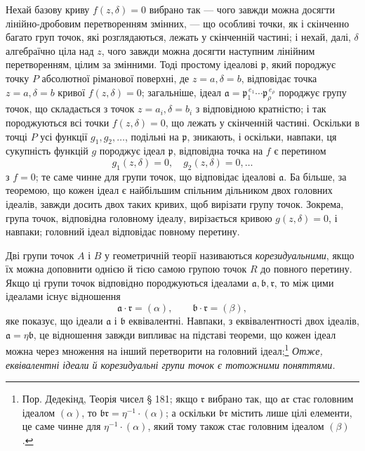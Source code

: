 \documentclass[11pt]{article}
\providecommand{\fra}{\mathfrak a}
\providecommand{\frb}{\mathfrak b}
\providecommand{\frp}{\mathfrak p}
\providecommand{\frr}{\mathfrak r}
\begin{document}
Нехай базову криву \(f(z,\delta)=0\) вибрано так --- чого завжди можна досягти лінійно-дробовим перетворенням змінних, --- що особливі точки, як і скінченно багато груп точок, які розглядаються, лежать у скінченній частині; і нехай, далі, \(\delta\) алгебраїчно ціла над \(z\), чого завжди можна досягти наступним лінійним перетворенням, цілим за змінними. Тоді простому ідеалові \(\frp\), який породжує точку \(P\) абсолютної ріманової поверхні, де \(z=a,\delta=b\), відповідає точка \(z=a,\delta=b\) кривої \(f(z,\delta)=0\); загальніше, ідеал \(\fra=\frp_1^{\,e_1}\cdots\frp_\rho^{\,e_\rho}\) породжує групу точок, що складається з точок \(z=a_i,\delta=b_i\) з відповідною кратністю; і так породжуються всі точки \(f(z,\delta)=0\), що лежать у скінченній частині. Оскільки в точці \(P\) усі функції \(g_1,g_2,\ldots\), подільні на \(\frp\), зникають, і оскільки, навпаки, ця сукупність функцій \(g\) породжує ідеал \(\frp\), відповідна точка на \(f\) є перетином
\[
g_1(z,\delta)=0,\quad g_2(z,\delta)=0,\ldots
\]
з \(f=0\); те саме чинне для групи точок, що відповідає ідеалові \(\fra\). Ба більше, за теоремою, що кожен ідеал є найбільшим спільним дільником двох головних ідеалів, завжди досить двох таких кривих, щоб вирізати групу точок. Зокрема, група точок, відповідна головному ідеалу, вирізається кривою \(g(z,\delta)=0\), і навпаки; головний ідеал відповідає повному перетину.

Дві групи точок \(A\) і \(B\) у геометричній теорії називаються \emph{корезидуальними}, якщо їх можна доповнити однією й тією самою групою точок \(R\) до повного перетину. Якщо ці групи точок відповідно породжуються ідеалами \(\fra,\frb,\frr\), то між цими ідеалами існує відношення
\[
\fra\cdot\frr=(\alpha),\qquad \frb\cdot\frr=(\beta),
\]
яке показує, що ідеали \(\fra\) і \(\frb\) еквівалентні. Навпаки, з еквівалентності двох ідеалів, \(\fra=\eta\frb\), це відношення завжди випливає на підставі теореми, що кожен ідеал можна через множення на інший перетворити на головний ідеал;\footnote{Пор. Дедекінд, Теорія чисел § 181; якщо \(\frr\) вибрано так, що \(\fra\frr\) стає головним ідеалом \((\alpha)\), то \(\frb\frr=\eta^{-1}\cdot(\alpha)\); а оскільки \(\frb\frr\) містить лише цілі елементи, це саме чинне для \(\eta^{-1}\cdot(\alpha)\), який тому також стає головним ідеалом \((\beta)\).} \emph{Отже, еквівалентні ідеали й корезидуальні групи точок є тотожними поняттями.}
\end{document}
